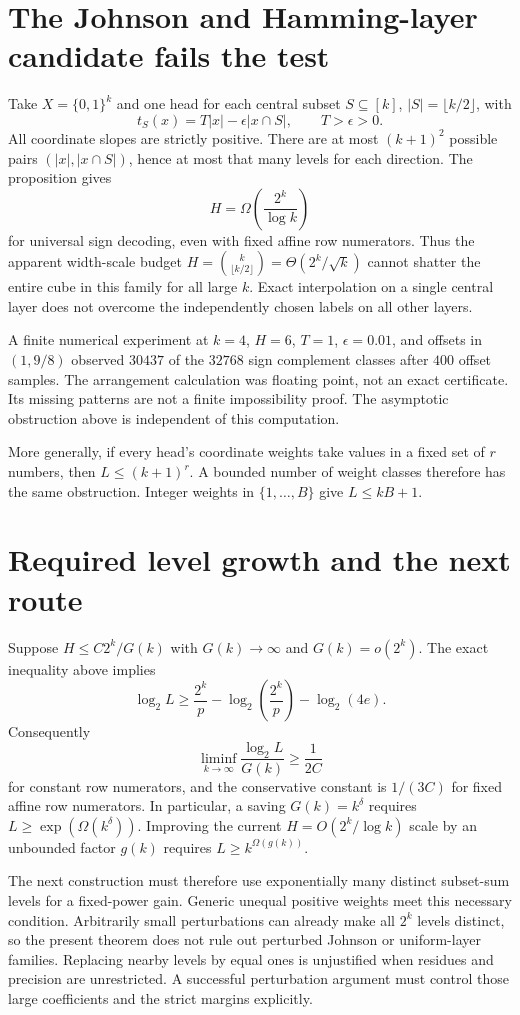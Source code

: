 \documentclass[11pt]{article}
\begin{document}
\section{The Johnson and Hamming-layer candidate fails the test}

Take $X=\{0,1\}^k$ and one head for each central subset
$S\subseteq[k]$, $|S|=\lfloor k/2\rfloor$, with
\[
 t_S(x)=T|x|-\epsilon|x\cap S|,\qquad T>\epsilon>0.
\]
All coordinate slopes are strictly positive. There are at most
$(k+1)^2$ possible pairs $(|x|,|x\cap S|)$, hence at most that many
levels for each direction. The proposition gives
\[
 H=\Omega\left(\frac{2^k}{\log k}\right)
\]
for universal sign decoding, even with fixed affine row numerators.
Thus the apparent width-scale budget
$H=\binom{k}{\lfloor k/2\rfloor}=\Theta(2^k/\sqrt{k})$
cannot shatter the entire cube in this family for all large $k$.
Exact interpolation on a single central layer does not overcome the
independently chosen labels on all other layers.

A finite numerical experiment at $k=4$, $H=6$, $T=1$,
$\epsilon=0.01$, and offsets in $(1,9/8)$ observed $30437$ of the $32768$
sign complement classes after $400$ offset samples. The arrangement
calculation was floating point, not an exact certificate. Its missing
patterns are not a finite impossibility proof. The asymptotic obstruction
above is independent of this computation.

More generally, if every head's coordinate weights take values in a
fixed set of $r$ numbers, then $L\leq(k+1)^r$. A bounded number of
weight classes therefore has the same obstruction. Integer weights in
$\{1,\ldots,B\}$ give $L\leq kB+1$.

\section{Required level growth and the next route}

Suppose $H\leq C2^k/G(k)$ with $G(k)\to\infty$ and $G(k)=o(2^k)$.
The exact inequality above implies
\[
 \log_2L\geq \frac{2^k}{p}
             -\log_2\left(\frac{2^k}{p}\right)-\log_2(4e).
\]
Consequently
\[
 \liminf_{k\to\infty}\frac{\log_2L}{G(k)}\geq\frac1{2C}
\]
for constant row numerators, and the conservative constant is $1/(3C)$
for fixed affine row numerators. In particular, a saving $G(k)=k^\delta$
requires $L\geq\exp(\Omega(k^\delta))$. Improving the current
$H=O(2^k/\log k)$ scale by an unbounded factor $g(k)$ requires
$L\geq k^{\Omega(g(k))}$.

The next construction must therefore use exponentially many distinct
subset-sum levels for a fixed-power gain. Generic unequal positive
weights meet this necessary condition. Arbitrarily small perturbations
can already make all $2^k$ levels distinct, so the present theorem does
not rule out perturbed Johnson or uniform-layer families. Replacing
nearby levels by equal ones is unjustified when residues and precision
are unrestricted. A successful perturbation argument must control those
large coefficients and the strict margins explicitly.
\end{document}
